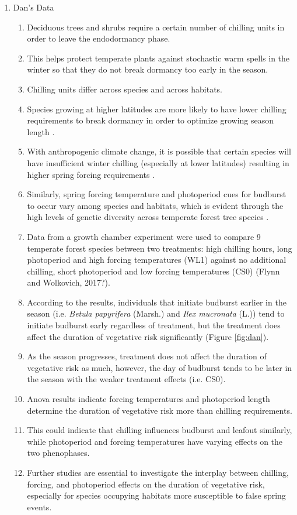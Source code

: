 \documentclass{article}\usepackage[]{graphicx}\usepackage[]{color}
\begin{document}
\begin{enumerate}
\item Dan's Data
\begin{enumerate}
\item Deciduous trees and shrubs require a certain number of chilling units in order to leave the endodormancy phase. 
\item This helps protect temperate plants against stochastic warm spells in the winter so that they do not break dormancy too early in the season.
\item Chilling units differ across species and across habitats.
\item Species growing at higher latitudes are more likely to have lower chilling requirements to break dormancy \citep{Myking1995, Howe2003} in order to optimize growing season length \citep{Prevey2017}. %
\item With anthropogenic climate change, it is possible that certain species will have insufficient winter chilling (especially at lower latitudes) resulting in higher spring forcing requirements \citep{McCreary1990, Morin2009, Fu2012, Polgar2014, Chuine2010}.
\item Similarly, spring forcing temperature and photoperiod cues for budburst to occur vary among species and habitats, which is evident through the high levels of genetic diversity across temperate forest tree species \citep{Chuine2001}.
\item Data from a growth chamber experiment were used to compare 9 temperate forest species between two treatments: high chilling hours, long photoperiod and high forcing temperatures (WL1) against no additional chilling, short photoperiod and low forcing temperatures (CS0) (Flynn and Wolkovich, 2017?).

\item According to the results, individuals that initiate budburst earlier in the season (i.e. {\textit {Betula papyrifera}} (Marsh.) and {\textit{Ilex mucronata}} (L.)) tend to initiate budburst early regardless of treatment, but the treatment does affect the duration of vegetative risk significantly (Figure \ref{fig:dan}).
\item As the season progresses, treatment does not affect the duration of vegetative risk as much, however, the day of budburst tends to be later in the season with the weaker treatment effects (i.e. CS0).
\item Anova results indicate forcing temperatures and photoperiod length determine the duration of vegetative risk more than chilling requirements.
\item This could indicate that chilling influences budburst and leafout similarly, while photoperiod and forcing temperatures have varying effects on the two phenophases.
\item Further studies are essential to investigate the interplay between chilling, forcing, and photoperiod effects on the duration of vegetative risk, especially for species occupying habitats more susceptible to false spring events. 
\end{enumerate}



\end{enumerate}
\end{document}
